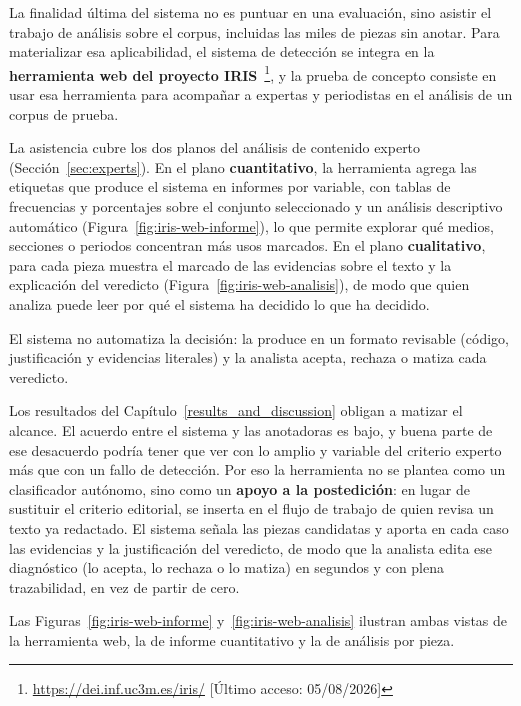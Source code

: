 
La finalidad última del sistema no es puntuar en una evaluación, sino asistir el
trabajo de análisis sobre el corpus, incluidas las miles de piezas sin anotar.
Para materializar esa aplicabilidad, el sistema de detección se integra en la
\textbf{herramienta web del proyecto IRIS}~\cite{avi2026}\footnote{\url{https://dei.inf.uc3m.es/iris/} [Último acceso: 05/08/2026]},
y la prueba de concepto consiste en usar esa herramienta para acompañar a expertas
y periodistas en el análisis de un corpus de prueba.

La asistencia cubre los dos planos del análisis de contenido experto
(Sección~\ref{sec:experts}). En el plano \textbf{cuantitativo}, la herramienta agrega
las etiquetas que produce el sistema en informes por variable, con tablas de
frecuencias y porcentajes sobre el conjunto seleccionado y un análisis descriptivo
automático (Figura~\ref{fig:iris-web-informe}), lo que permite explorar qué medios,
secciones o periodos concentran más usos marcados. En el plano \textbf{cualitativo},
para cada pieza muestra el marcado de las evidencias sobre el texto y la explicación
del veredicto (Figura~\ref{fig:iris-web-analisis}), de modo que quien analiza puede
leer por qué el sistema ha decidido lo que ha decidido.

El sistema no automatiza la decisión: la produce en un formato revisable (código,
justificación y evidencias literales) y la analista acepta, rechaza o matiza cada
veredicto.

Los resultados del Capítulo~\ref{results_and_discussion} obligan a matizar el
alcance. El acuerdo entre el sistema y las anotadoras es bajo, y buena parte de ese
desacuerdo podría tener que ver con lo amplio y variable del criterio experto más que con
un fallo de detección. Por eso la herramienta no se plantea como un clasificador
autónomo, sino como un
\textbf{apoyo a la postedición}: en lugar de sustituir el criterio editorial, se
inserta en el flujo de trabajo de quien revisa un texto ya redactado. El sistema
señala las piezas candidatas y aporta en cada caso las evidencias y la
justificación del veredicto, de modo que la analista edita ese diagnóstico
(lo acepta, lo rechaza o lo matiza) en segundos y con plena trazabilidad, en vez
de partir de cero.

Las Figuras~\ref{fig:iris-web-informe} y~\ref{fig:iris-web-analisis} ilustran ambas
vistas de la herramienta web, la de informe cuantitativo y la de análisis por pieza.

